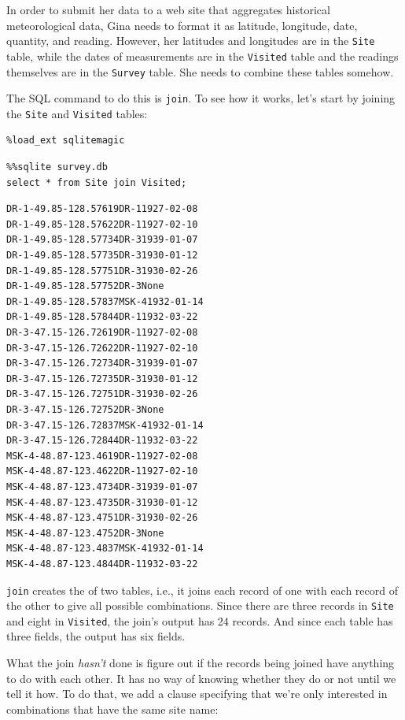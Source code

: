 \documentclass{book}
\begin{document}
In order to submit her data to a web site that aggregates historical
meteorological data, Gina needs to format it as latitude, longitude,
date, quantity, and reading. However, her latitudes and longitudes are
in the \texttt{Site} table, while the dates of measurements are in the
\texttt{Visited} table and the readings themselves are in the
\texttt{Survey} table. She needs to combine these tables somehow.

The SQL command to do this is \texttt{join}. To see how it works, let's
start by joining the \texttt{Site} and \texttt{Visited} tables:

\begin{verbatim}
%load_ext sqlitemagic
\end{verbatim}

\begin{verbatim}
%%sqlite survey.db
select * from Site join Visited;
\end{verbatim}

\begin{verbatim}
DR-1-49.85-128.57619DR-11927-02-08
DR-1-49.85-128.57622DR-11927-02-10
DR-1-49.85-128.57734DR-31939-01-07
DR-1-49.85-128.57735DR-31930-01-12
DR-1-49.85-128.57751DR-31930-02-26
DR-1-49.85-128.57752DR-3None
DR-1-49.85-128.57837MSK-41932-01-14
DR-1-49.85-128.57844DR-11932-03-22
DR-3-47.15-126.72619DR-11927-02-08
DR-3-47.15-126.72622DR-11927-02-10
DR-3-47.15-126.72734DR-31939-01-07
DR-3-47.15-126.72735DR-31930-01-12
DR-3-47.15-126.72751DR-31930-02-26
DR-3-47.15-126.72752DR-3None
DR-3-47.15-126.72837MSK-41932-01-14
DR-3-47.15-126.72844DR-11932-03-22
MSK-4-48.87-123.4619DR-11927-02-08
MSK-4-48.87-123.4622DR-11927-02-10
MSK-4-48.87-123.4734DR-31939-01-07
MSK-4-48.87-123.4735DR-31930-01-12
MSK-4-48.87-123.4751DR-31930-02-26
MSK-4-48.87-123.4752DR-3None
MSK-4-48.87-123.4837MSK-41932-01-14
MSK-4-48.87-123.4844DR-11932-03-22
\end{verbatim}

\texttt{join} creates the  of
two tables, i.e., it joins each record of one with each record of the
other to give all possible combinations. Since there are three records
in \texttt{Site} and eight in \texttt{Visited}, the join's output has 24
records. And since each table has three fields, the output has six
fields.

What the join \emph{hasn't} done is figure out if the records being
joined have anything to do with each other. It has no way of knowing
whether they do or not until we tell it how. To do that, we add a clause
specifying that we're only interested in combinations that have the same
site name:
\end{document}

